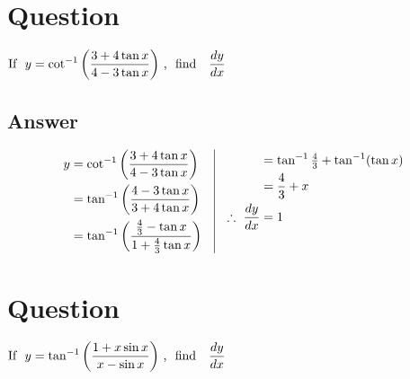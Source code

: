 \documentclass[17pt]{extarticle}
\begin{document}
\noindent
\begin{fleqn} 


\section{Question} 

$\begin{aligned}[t] 
\text{If \ } y =  \cot^{-1}\left(\frac{3 + 4\tan x}{4 - 3\tan x}\right) \text{\,, \  find \ \  } \frac{dy}{dx}
\end{aligned}$

\subsection*{Answer}
\begin{equation} \nonumber
\begin{alignedat}{4}
y &=  \cot^{-1}\left(\frac{3 + 4\tan x}{4 - 3\tan x}\right)\\
  &=  \tan^{-1}\left(\frac{4 - 3\tan x}{3 + 4\tan x}\right)\\
  &=  \tan^{-1}\left(\frac{\frac{4}{3} - \tan x}{1 + \frac{4}{3}\tan x}\right)\\
\end{alignedat}
\quad
\vrule
\quad 
\begin{alignedat}{4}
&=  \tan^{-1} \tfrac{4}{3} + \tan^{-1}(\tan x)  \\
&=  \frac{4}{3} + x \\
\therefore \  \frac{dy}{dx} &= 1
& \\
& \\
\end{alignedat}
\end{equation}
\section{Question} 

$\begin{aligned}[t] 
\text{If \ } y =  \tan^{-1}\left(\frac{1 + x \sin x}{x - \sin x}\right) \text{\,, \  find \ \  } \frac{dy}{dx}
\end{aligned}$


\end{fleqn}
\end{document}
